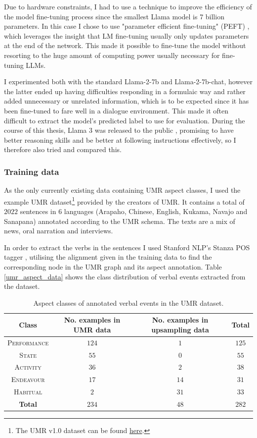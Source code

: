 Due to hardware constraints, I had to use a technique to improve the efficiency of the model fine-tuning process since the smallest Llama model is 7 billion parameters. In this case I chose to use "parameter efficient fine-tuning" (PEFT) \citep{peft}, which leverages the insight that LM fine-tuning usually only updates parameters at the end of the network. This made it possible to fine-tune the model without resorting to the huge amount of computing power usually necessary for fine-tuning LLMs.

I experimented both with the standard \textsf{Llama-2-7b} and \textsf{Llama-2-7b-chat}, however the latter ended up having difficulties responding in a formulaic way and rather added unnecessary or unrelated information, which is to be expected since it has been fine-tuned to fare well in a dialogue environment. This made it often difficult to extract the model's predicted label to use for evaluation. During the course of this thesis, Llama 3 was released to the public \citep{meta2024llama3}, promising to have better reasoning skills and be better at following instructions effectively, so I therefore also tried and compared this.

\subsubsection*{Training data}
As the only currently existing data containing UMR aspect classes, I used the example UMR dataset\footnote{The UMR v1.0 dataset can be found \hyperlink{https://umr4nlp.github.io/web/data.html}{here}.} provided by the creators of UMR. It contains a total of $2022$ sentences in 6 languages (Arapaho, Chinese, English, Kukama, Navajo and Sanapana) annotated according to the UMR schema. The texts are a mix of news, oral narration and interviews.

In order to extract the verbs in the sentences I used Stanford NLP's Stanza POS tagger \citep{qi2020stanzapythonnaturallanguage}, utilising the alignment given in the training data to find the corresponding node in the UMR graph and its aspect annotation. Table \ref*{umr_aspect_data} shows the class distribution of verbal events extracted from the dataset.
\begin{table}
    \centering
    \begin{tabular}{|c|c|c|c|}
        Class & No. examples in UMR data & No. examples in upsampling data & \textbf{Total} \\ \hline
        \textsc{Performance} & $124$ & $1$ & $125$\\
        \textsc{State} & $55$ & $0$ & $55$\\
        \textsc{Activity} & $36$ & $2$ & $38$\\
        \textsc{Endeavour} & $17$ & $14$ & $31$\\
        \textsc{Habitual} & $2$ & $31$ & $33$\\ \hline
        \textbf{Total} & $234$ & $48$ & $282$
    \end{tabular}
    \caption{Aspect classes of annotated verbal events in the UMR dataset.}
\end{table}

